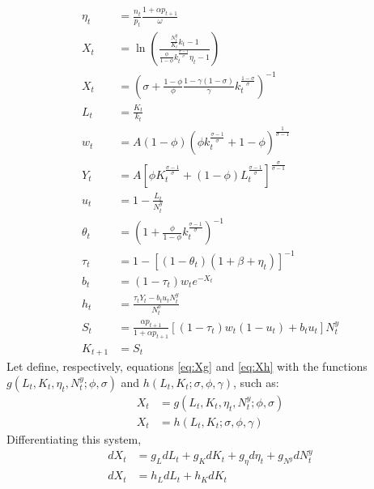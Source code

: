 	\begin{align}
		\eta_t &= \frac{n_t}{p_t}\frac{1+\alpha p_{t+1}}{\omega} \tag{Pub. $\eta$} \\
		X_t &= \ln\left( \frac{ \frac{N_t^y}{K_t} k_t - 1 } { \frac{\phi}{1-\phi} k_t^{\frac{\sigma-1}{\sigma}} \eta_t - 1 }\right) \tag{Eq. $g$} \\
		X_t &= \left( \sigma + \frac{1-\phi}{\phi} \frac{1-\gamma(1-\sigma)}{\gamma} k_t^{\frac{1-\sigma}{\sigma}} \right)^{-1} \tag{Eq. h}\\
		L_t &= \frac{K_t}{k_t} \tag{Prod. $L$} \\
		w_t &= A(1-\phi)\left( \phi k_t^\frac{\sigma-1}{\sigma} + 1-\phi \right)^\frac{1}{\sigma-1} \tag{Prod. $w$}\\
		Y_t &= A \left[ \phi K_t^\frac{\sigma-1}{\sigma} + (1-\phi) L_t^\frac{\sigma-1}{\sigma} \right]^\frac{\sigma}{\sigma-1} \tag{Prod. $Y$}\\
		u_t &= 1 - \frac{L_t}{N_t^y} \tag{Prod. $u$}\\
		\theta_t &= \left(1 + \frac{\phi}{1-\phi} k_t^\frac{\sigma-1}{\sigma} \right)^{-1} \tag{Prod. $\theta$} \\
		\tau_t &= 1 - \left[ (1-\theta_t)(1+\beta+\eta_t) \right]^{-1} \tag{Pub. $\tau$}\\
		b_t &= (1-\tau_t) w_t e^{-X_t} \tag{Pub. $b$}\\
		h_t &= \frac{\tau_t Y_t - b_t u_t N_t^y}{N_t^o} \tag{Pub. $h$}\\
		S_t &= \frac{\alpha p_{t+1}}{1 + \alpha p_{t+1}} \left[ (1-\tau_t)w_t(1-u_t) + b_tu_t \right] N_t^y \tag{HH. $S$}  \\
		K_{t+1} &= S_t	\tag{HH. $K$}
	\end{align}
Let define, respectively, equations \eqref{eq:Xg} and \eqref{eq:Xh} with the functions $g(L_t, K_t, \eta_t, N_t^y; \phi, \sigma)$ and $h(L_t, K_t; \sigma, \phi, \gamma)$, such as:
	\begin{align*}
		X_t &= g(L_t, K_t, \eta_t, N_t^y; \phi, \sigma) 
		\\
		X_t &= h(L_t, K_t; \sigma, \phi, \gamma) 
	\end{align*}
Differentiating this system,
	\begin{align*}
		dX_t &= g_L dL_t + g_K dK_t + g_\eta d\eta_t + g_{N^y} dN_t^y \\
		dX_t &= h_L dL_t + h_K dK_t
	\end{align*}
